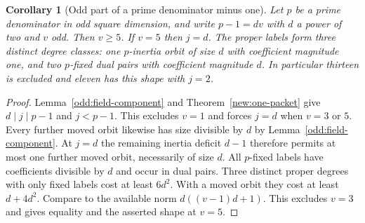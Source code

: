 \documentclass[11pt]{amsart}
\numberwithin{equation}{section}
\newtheorem{corollary}[theorem]{Corollary}
\theoremstyle{definition}
\theoremstyle{plain}
\begin{document}
\begin{corollary}[Odd part of a prime denominator minus one]
\label{new:odd-prime-profile}\label{odd:four-five-edge}
Let $p$ be a prime denominator in odd square dimension, and write
$p-1=dv$ with $d$ a power of two and $v$ odd. Then $v\ge5$.
If $v=5$ then $j=d$. The proper labels form three distinct degree
classes: one $p$-inertia orbit of size $d$ with coefficient magnitude
one, and two $p$-fixed dual pairs with coefficient magnitude $d$.
In particular thirteen is excluded and eleven has this shape with $j=2$.
\end{corollary}
\begin{proof}
Lemma~\ref{odd:field-component} and Theorem~\ref{new:one-packet}
give $d\mid j\mid p-1$ and $j<p-1$. This excludes $v=1$ and forces
$j=d$ when $v=3$ or $5$. Every further moved orbit likewise has
size divisible by $d$ by Lemma~\ref{odd:field-component}.
At $j=d$ the remaining inertia deficit $d-1$ therefore permits
at most one further moved orbit, necessarily of size $d$.
All $p$-fixed labels have coefficients divisible by $d$ and occur
in dual pairs. Three distinct proper degrees with only fixed labels
cost at least $6d^2$. With a moved orbit they cost at least
$d+4d^2$. Compare to the available norm $d((v-1)d+1)$.
This excludes $v=3$ and gives equality and the asserted shape at $v=5$.
\end{proof}
\end{document}
